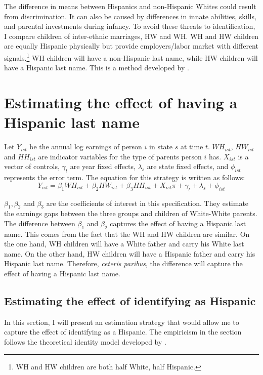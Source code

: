 \documentclass{wptemp}
\begin{document}
The difference in means between Hispanics and non-Hispanic Whites could result from discrimination. It can also be caused by differences in innate abilities, skills, and parental investments during infancy. To avoid these threats to identification, I compare children of inter-ethnic marriages, HW and WH. WH and HW children are equally Hispanic physically but provide employers/labor market with different signals.\footnote{WH and HW children are both half White, half Hispanic.} WH children will have a non-Hispanic last name, while HW children will have a Hispanic last name. This is a method developed by \citet{rubinstein2014pride}.

\section{Estimating the effect of having a Hispanic last name}

Let $Y_{ist}$ be the annual log earnings of person $i$ in state $s$ at time $t$. $WH_{ist}$, $HW_{ist}$ and $HH_{ist}$ are indicator variables for the type of parents person $i$ has. $X_{ist}$ is a vector of controls, $\gamma_{t}$ are year fixed effects, $\lambda_{s}$ are state fixed effects, and $\phi_{ist}$ represents the error term. The equation for this strategy is written as follows:
\begin{equation} \label{eq:1a}
Y_{ist} = \beta_{1} WH_{ist} +\beta_{2} HW_{ist} + \beta_{3} HH_{ist} + X_{ist} \pi + \gamma_{t} + \lambda_s + \phi_{ist}
\end{equation}

$\beta_{1}, \beta_{2}$ and $\beta_{3}$ are the coefficients of interest in this specification. They estimate the earnings gaps between the three groups and children of White-White parents. The difference between $\beta_{1}$ and $\beta_{2}$ captures the effect of having a Hispanic last name. This comes from the fact that the WH and HW children are similar. On the one hand, WH children will have a White father and carry his White last name. On the other hand, HW children will have a Hispanic father and carry his Hispanic last name. Therefore, \textit{ceteris paribus}, the difference will capture the effect of having a Hispanic last name.

\subsection{Estimating the effect of identifying as Hispanic}

In this section, I will present an estimation strategy that would allow me to capture the effect of identifying as a Hispanic. The empiricism in the section follows the theoretical identity model developed by \citet{akerlof2000economics}. 
\end{document}
